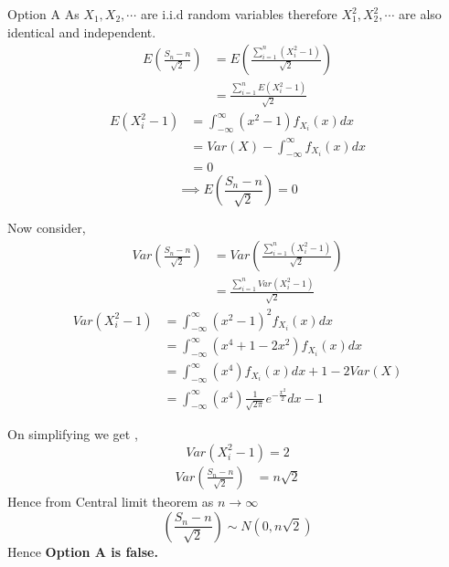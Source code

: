 \documentclass{beamer}
\providecommand{\brak}[1]{\ensuremath{\left(#1\right)}}
\begin{document}
\begin{frame}{Option A}
As $X_1,X_2,\cdots $ are i.i.d random variables therefore $X_{1}^2,X_
{2}^2,\cdots$ are also identical and independent.
    \begin{align}
    E\brak{\frac{S_{n}-n}{\sqrt{2}}}&=E\brak{\frac{\sum_{i=1}^{n}{(X_{i}^{2}-1)}}{\sqrt{2}}}\\
    &={\frac{\sum_{i=1}^{n}E{(X_{i}^{2}-1)}}{\sqrt{2}}}\label{eq:expectation}
\end{align}
\begin{align}
    E(X_i^2-1)&=\int_{-\infty}^{\infty}(x^2-1)f_{X_i}(x)dx\\
    &=Var(X)-\int_{-\infty}^{\infty}f_{X_i}(x)dx\\
    &=0\label{eq:0}
\end{align}
\begin{equation}
    \implies E\brak{\frac{S_{n}-n}{\sqrt{2}}}=0
\end{equation}
\end{frame}
\begin{frame}
Now consider,
\begin{align}
    Var\brak{\frac{S_{n}-n}{\sqrt{2}}}&=Var\brak{{\frac{\sum_{i=1}^{n}{(X_{i}^{2}-1)}}{\sqrt{2}}}}\\
    &={\frac{\sum_{i=1}^{n}Var{(X_{i}^{2}-1)}}{\sqrt{2}}}
\end{align}
\begin{align}
    Var(X_{i}^2-1)&=\int_{-\infty}^{\infty}(x^2-1)^2 f_{X_{i}}(x)dx\\
    &=\int_{-\infty}^{\infty}(x^4+1-2x^{2}) f_{X_{i}}(x)dx\\
    &=\int_{-\infty}^{\infty}(x^4)f_{X_{i}}(x)dx +1-2Var(X)\\
    &=\int_{-\infty}^{\infty}(x^4)\frac{1}{\sqrt{2\pi}}e^{-\frac{x^2}{2}}dx -1
\end{align}
\end{frame}
\begin{frame}
On simplifying we get ,
\begin{equation}
    Var(X_{i}^2-1)=2 \label{eq:var}
\end{equation}
\begin{align}
        Var\brak{\frac{S_{n}-n}{\sqrt{2}}}&=n\sqrt{2}    
\end{align}
Hence from Central limit theorem as $n \to \infty$
\begin{equation}
    \brak{\frac{S_{n}-n}{\sqrt{2}}}\sim N(0,n\sqrt{2})
\end{equation}
Hence \textbf{Option A is false.}
\end{frame}
\end{document}
